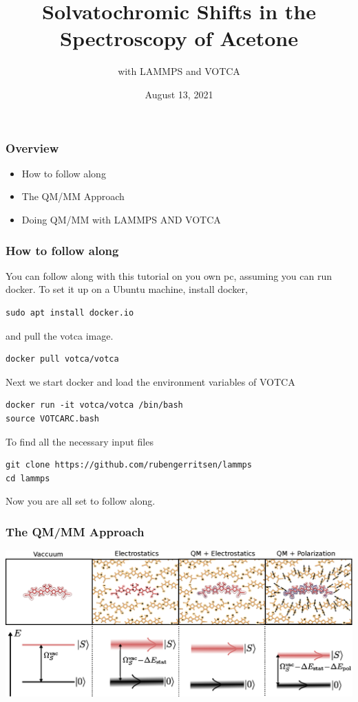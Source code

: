 \documentclass[t,aspectratio=169, 8pt]{beamer}
\title{Solvatochromic Shifts in the Spectroscopy of Acetone}
\subtitle{\Large with LAMMPS and VOTCA}
\author{August 13, 2021}
\begin{document}
\begin{titleframe}[variant=1,bgimage=background.png]
\end{titleframe}

\begin{chapterframe}
  \frametitle{Overview}
  \begin{itemize}
    \item How to follow along
    \item The QM/MM Approach
    \item Doing QM/MM with LAMMPS AND VOTCA
  \end{itemize}
\end{chapterframe}



\begin{frame}[fragile]
  \frametitle{How to follow along}
  You can follow along with this tutorial on you own pc, assuming you can run docker. To set it up on a Ubuntu machine, install docker,
  \begin{verbatim}
sudo apt install docker.io
  \end{verbatim}
  and pull the votca image.
  \begin{verbatim}
docker pull votca/votca
  \end{verbatim}
  Next we start docker and load the environment variables of VOTCA
  \begin{verbatim}
docker run -it votca/votca /bin/bash
source VOTCARC.bash
  \end{verbatim}
  To find all the necessary input files
  \begin{verbatim}
git clone https://github.com/rubengerritsen/lammps
cd lammps
\end{verbatim}
  Now you are all set to follow along.

\end{frame}


\begin{frame}
  \frametitle{The QM/MM Approach}
  \centering
  \includegraphics[height=0.65\textheight]{images/siteenergies}
\end{frame}
\end{document}
